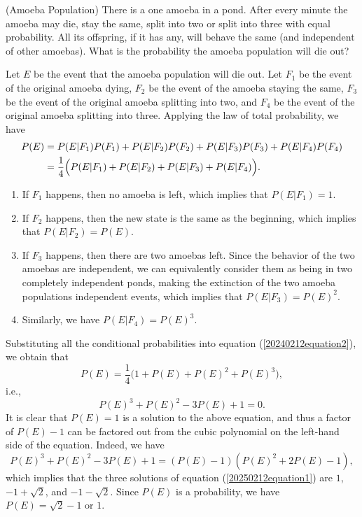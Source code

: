 \documentclass[12pt,letterpaper, onecolumn]{exam}
\begin{document}
\begin{questions}
\question[](Amoeba Population) There is a one amoeba in a pond. After every minute the amoeba may die, stay the same, split into two or split into three with equal probability. All its offspring, if it has any, will behave the same (and independent of other amoebas). What is the probability the amoeba population will die out?
\begin{solution}
    Let $E$ be the event that the amoeba population will die out. Let $F_1$ be the event of the original amoeba dying, $F_2$ be the event of the amoeba staying the same, $F_3$ be the event of the original amoeba splitting into two, and $F_4$ be the event of the original amoeba splitting into three. Applying the law of total probability, we have
    \begin{align}\label{20240212equation2}
        P(E)&=P(E|F_1)P(F_1)+P(E|F_2)P(F_2)+P(E|F_3)P(F_3)+P(E|F_4)P(F_4)\notag\\
        &=\frac{1}{4}\Big(P(E|F_1)+P(E|F_2)+P(E|F_3)+P(E|F_4)\Big).
    \end{align} 
    \begin{enumerate}
        \item If $F_1$ happens, then no amoeba is left, which implies that $P(E|F_1)=1$.
        \item If $F_2$ happens, then the new state is the same as the beginning, which implies that $P(E|F_2)=P(E)$.
        \item If $F_3$ happens, then there are two amoebas left. Since the behavior of the two amoebas are independent, we can equivalently consider them as being in two completely independent ponds, making the extinction of the two amoeba populations independent events, which implies that $P(E|F_3)=P(E)^2$.
        \item Similarly, we have $P(E|F_4)=P(E)^3$.
    \end{enumerate}
    Substituting all the conditional probabilities into equation (\ref{20240212equation2}), we obtain that
    $$P(E)=\frac{1}{4}\Big(1+P(E)+P(E)^2+P(E)^3\Big),$$
    i.e.,
    \begin{equation}\label{20250212equation1}
        P(E)^3+P(E)^2-3P(E)+1=0.
    \end{equation}
    It is clear that $P(E)=1$ is a solution to the above equation, and thus a factor of $P(E)-1$ can be factored out from the cubic polynomial on the left-hand side of the equation. Indeed, we have 
    $$P(E)^3+P(E)^2-3P(E)+1=(P(E)-1)(P(E)^2+2P(E)-1),$$
    which implies that the three solutions of equation (\ref{20250212equation1}) are $1$, $-1+\sqrt{2}$, and $-1-\sqrt{2}$. Since $P(E)$ is a probability, we have $P(E)=\sqrt{2}-1$ or $1$.


\end{solution}
\end{questions}
\end{document}
